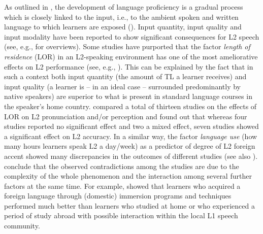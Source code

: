 As outlined in , the development of language proficiency is a gradual process which is closely linked to the input, i.e., to the ambient spoken and written language to which learners are exposed (\citealt[5]{ColantoniEtAl2015}). Input quantity, input quality and input modality have been reported to show significant consequences for L2 speech (see, e.g., \citealt{PiskeEtAl2001, ColantoniEtAl2015, DerwingMunro2015} for overviews). Some studies have purported that the factor \textit{length of residence} (LOR) in an L2-speaking environment has one of the most ameliorative effects on L2 performance (see, e.g., \citealt{AsherGarcía1969, PurcellSuter1980, FlegeEtAl1997, FlegeFletcher1992, HenriksenEtAl2010}). This can be explained by the fact that in such a context both input quantity (the amount of TL a learner receives) and input quality (a learner is -- in an ideal case -- surrounded predominantly by native speakers) are superior to what is present in standard language courses in the speaker’s home country. \citet{DerwingMunro2015} compared a total of thirteen studies on the effects of LOR on L2 pronunciation and/or perception and found out that whereas four studies reported no significant effect and two a mixed effect, seven studies showed a significant effect on L2 accuracy. In a similar way, the factor \textit{language use} (how many hours learners speak L2 a day/week) as a predictor of degree of L2 foreign accent showed many discrepancies in the outcomes of different studies (see also \citealt{PiskeEtAl2001}). \citet[39]{DerwingMunro2015} conclude that the observed contradictions among the studies are due to the complexity of the whole phenomenon and the interaction among several further factors at the same time. For example, \citet{FreedEtAl2004} showed that learners who acquired a foreign language through (domestic) immersion programs and techniques performed much better than learners who studied at home or who experienced a period of study abroad with possible interaction within the local L1 speech community.


